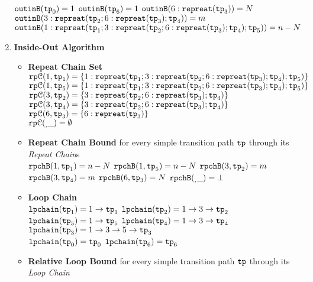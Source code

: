 \begin{enumerate}
  \\
$\mathtt{outinB}(\mathtt{tp}_0) = 1$
\quad
$\mathtt{outinB}(\mathtt{tp}_6) = 1$
\quad
$\mathtt{outinB}(6 : \mathtt{repreat}(\mathtt{tp}_3)) = N $
\\
$\mathtt{outinB}(3: \mathtt{repreat}(\mathtt{tp}_2; 6 : \mathtt{repreat}(\mathtt{tp}_3); \mathtt{tp}_4)) = m $
\\
$\mathtt{outinB}(1: \mathtt{repreat}(\mathtt{tp}_1; 3: \mathtt{repreat}(\mathtt{tp}_2; 6 : \mathtt{repreat}(\mathtt{tp}_3); \mathtt{tp}_4); \mathtt{tp}_5)) = n - N $
\item \textbf{Inside-Out Algorithm}
\begin{itemize}
  \item \textbf{Repeat Chain Set}
  \\
  $\mathtt{rp}\mathcal{C}(1, \mathtt{tp}_1) = \{1: \mathtt{repreat}(\mathtt{tp}_1; 3: \mathtt{repreat}(\mathtt{tp}_2; 6 : \mathtt{repreat}(\mathtt{tp}_3); \mathtt{tp}_4); \mathtt{tp}_5)\}$
  \\
  $\mathtt{rp}\mathcal{C}(1, \mathtt{tp}_5) = \{1: \mathtt{repreat}(\mathtt{tp}_1; 3: \mathtt{repreat}(\mathtt{tp}_2; 6 : \mathtt{repreat}(\mathtt{tp}_3); \mathtt{tp}_4); \mathtt{tp}_5)\}$
  \\
  $\mathtt{rp}\mathcal{C}(3, \mathtt{tp}_2) = \{3: \mathtt{repreat}(\mathtt{tp}_2; 6 : \mathtt{repreat}(\mathtt{tp}_3); \mathtt{tp}_4)\}$
  \\
  $\mathtt{rp}\mathcal{C}(3, \mathtt{tp}_4) = \{3: \mathtt{repreat}(\mathtt{tp}_2; 6 : \mathtt{repreat}(\mathtt{tp}_3); \mathtt{tp}_4)\}$
  \\
  $\mathtt{rp}\mathcal{C}(6, \mathtt{tp}_3) = \{6: \mathtt{repreat}(\mathtt{tp}_3)\}$
  \\
  $\mathtt{rp}\mathcal{C}(_, \_) = \emptyset$ 
  \item \textbf{Repeat Chain Bound} for every simple transition path $\mathtt{tp}$ through its \emph{Repeat Chain}s
  \\
  $\mathtt{rpchB}(1, \mathtt{tp}_1) = n - N$ \quad
  $\mathtt{rpchB}(1, \mathtt{tp}_5) = n - N$ \quad
  $\mathtt{rpchB}(3, \mathtt{tp}_2) = m$ \\
  $\mathtt{rpchB}(3, \mathtt{tp}_4) = m$ \quad
  $\mathtt{rpchB}(6, \mathtt{tp}_3) = N$ \quad \quad 
  $\mathtt{rpchB}(_, \_) = \bot $ 
  \item \textbf{Loop Chain}
  \\
  $\mathtt{lpchain}(\mathtt{tp}_1) = 1\to \mathtt{tp}_1$ \quad
  $\mathtt{lpchain}(\mathtt{tp}_2) = 1 \to 3 \to \mathtt{tp}_2$ \\
  $\mathtt{lpchain}(\mathtt{tp}_5) = 1\to \mathtt{tp}_5$ \quad
  $\mathtt{lpchain}(\mathtt{tp}_4) = 1 \to 3 \to \mathtt{tp}_4$ \\
  \highlight
  {$\mathtt{lpchain}(\mathtt{tp}_3) = 1 \to 3 \to 5 \to \mathtt{tp}_3$ }\\
  $\mathtt{lpchain}(\mathtt{tp}_0) = \mathtt{tp}_0$ \quad
  $\mathtt{lpchain}(\mathtt{tp}_6) = \mathtt{tp}_6$ 
  \item \textbf{{Relative Loop Bound}} for every simple transition path $\mathtt{tp}$ through its \emph{Loop Chain}

\end{itemize}
\end{enumerate}
